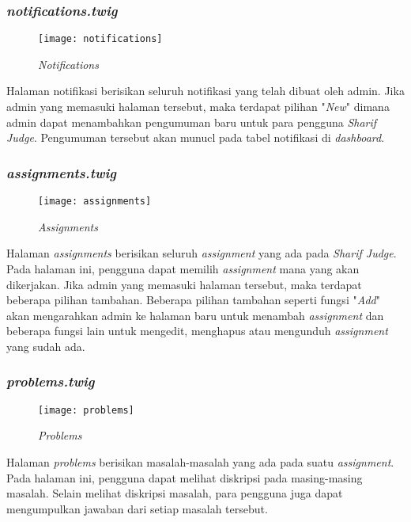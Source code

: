 \subsubsection{\textit{notifications.twig}}
\begin{figure}[H]
	\centering  
	\texttt{[image: notifications]}  
	\caption[\textit{Notifications}]{\textit{Notifications}} 
	\label{fig:notifications} 
\end{figure} 
Halaman notifikasi berisikan seluruh notifikasi yang telah dibuat oleh admin. Jika admin yang memasuki halaman tersebut, maka terdapat pilihan "\textit{New}" dimana admin dapat menambahkan pengumuman baru untuk para pengguna \textit{Sharif Judge}. Pengumuman tersebut akan munucl pada tabel notifikasi di \textit{dashboard}.

\subsubsection{\textit{assignments.twig}}
\begin{figure}[H]
	\centering  
	\texttt{[image: assignments]}  
	\caption[\textit{Assignments}]{\textit{Assignments}} 
	\label{fig:assignments} 
\end{figure} 
Halaman \textit{assignments} berisikan seluruh \textit{assignment} yang ada pada \textit{Sharif Judge}. Pada halaman ini, pengguna dapat memilih \textit{assignment} mana yang akan dikerjakan. Jika admin yang memasuki halaman tersebut, maka terdapat beberapa pilihan tambahan. Beberapa pilihan tambahan seperti fungsi "\textit{Add}" akan mengarahkan admin ke halaman baru untuk menambah \textit{assignment} dan beberapa fungsi lain untuk mengedit, menghapus atau mengunduh \textit{assignment} yang sudah ada.

\subsubsection{\textit{problems.twig}}
\begin{figure}[H]
	\centering  
	\texttt{[image: problems]}  
	\caption[\textit{Problems}]{\textit{Problems}} 
	\label{fig:problems} 
\end{figure} 
Halaman \textit{problems} berisikan masalah-masalah yang ada pada suatu \textit{assignment}. Pada halaman ini, pengguna dapat melihat diskripsi pada masing-masing masalah. Selain melihat diskripsi masalah, para pengguna juga dapat mengumpulkan jawaban dari setiap masalah tersebut.

